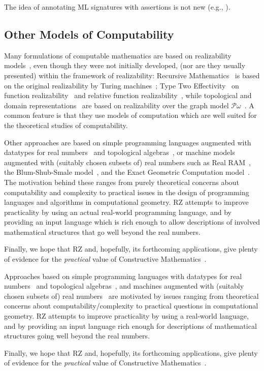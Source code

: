 The idea of annotating ML signatures with assertions is not new (e.g., \cite{kahrs+:tcs97}).
 
\subsection{Other Models of Computability}
\label{sec:models-of-computability}

Many formulations of computable mathematics are based on realizability
models~\cite{Bauer:00}, even though they were not initially developed,
(nor are they usually presented) within the framework of realizability:
Recursive Mathematics~\cite{ershov98:_handb_recur_mathem} is based on
the original realizability by Turing machines~\cite{KleeneSC:intint};
Type Two Effectivity~\cite{Wei00} on function
realizability~\cite{KleeneSC:fouim} and relative function
realizability~\cite{BirkedalL:devttc}, while topological and domain
representations~\cite{Bla97a,Bauer:Birkedal:Scott:98} are based on
realizability over the graph model
$\mathcal{P}\omega$~\cite{ScottD:dattl}. A common feature is
that they use models of computation which are well suited for the
theoretical studies of computability. 

\iflong
Other approaches are based on simple programming languages augmented with
datatypes for real numbers~\cite{escardo97:_pcf,marcial-romero04:_seman}
and topological algebras~\cite{TZ98}, or machine models augmented with
(suitably chosen subsets of) real numbers such as Real
RAM~\cite{borodin75}, the Blum-Shub-Smale
model~\cite{blum98:_compl_real_comput}, and the Exact Geometric
Computation model~\cite{yap06:_theor_real_comput_egc}. The motivation
behind these ranges from purely theoretical concerns about
computability and complexity to practical issues in the design of
programming languages and algorithms in computational geometry. RZ
attempts to improve practicality by using an actual
real-world programming language, and by providing an input language
which is rich enough to allow descriptions of involved mathematical
structures that go well beyond the real numbers.

Finally, we hope that RZ and, hopefully, its forthcoming applications,
give plenty of evidence for the \emph{practical} value of Constructive
Mathematics~\cite{Bishop:Bridges:85}.

\else %

Approaches based on simple programming languages with datatypes for
real numbers~\cite{escardo97:_pcf,marcial-romero04:_seman} and topological
algebras~\cite{TZ98}, and machines augmented with (suitably chosen
subsets of) real
numbers~\cite{borodin75,blum98:_compl_real_comput,yap06:_theor_real_comput_egc}
are motivated by issues ranging from theoretical concerns about
computability/complexity to practical questions in computational
geometry. RZ attempts to improve practicality by using a
real-world language, and by providing an input language
rich enough for descriptions of mathematical
structures going well beyond the real numbers.

Finally, we hope that RZ and, hopefully, its forthcoming applications,
give plenty of evidence for the \emph{practical} value of Constructive
Mathematics~\cite{Bishop:Bridges:85}.

\fi



